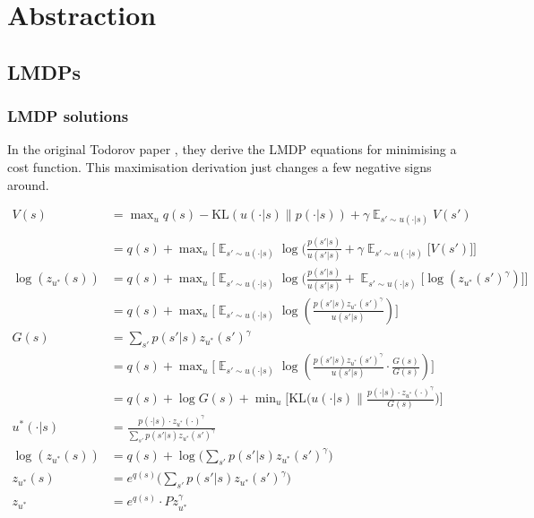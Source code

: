 \chapter{Abstraction}

\section{LMDPs}

\subsection{LMDP solutions}\label{lmdp-derivation}


In the original Todorov paper \cite{Todorov2009}, they derive the LMDP equations for minimising a cost function. This maximisation derivation just changes a few negative signs around.

\begin{align*}
V(s) &= \mathop{\text{max}}_{u} q(s) - \text{KL}(u(\cdot| s) \parallel p(\cdot | s)) + \gamma \mathop{\mathbb E}_{s' \sim u(\cdot | s)} V(s') \tag{1}\\
\\
&= q(s) + \mathop{\text{max}}_{u} \bigg[ \mathop{\mathbb E}_{s' \sim u(\cdot | s)} \log(\frac{p(s' | s) }{ u(s' | s)}+\gamma \mathop{\mathbb E}_{s' \sim u(\cdot | s)} \big[V(s')\big] \bigg] \tag{2}\\
\log(z_{u^{* }}(s)) &= q(s) + \mathop{\text{max}}_{u} \bigg[ \mathop{\mathbb E}_{s' \sim u(\cdot | s)} \log(\frac{p(s' | s) }{ u(s' | s)}+\mathop{\mathbb E}_{s' \sim u(\cdot | s)} \big[\log(z_{u^{* }}(s')^{\gamma})\big] \bigg] \tag{3}\\
&= q(s) + \mathop{\text{max}}_{u} \bigg[ \mathop{\mathbb E}_{s' \sim u(\cdot | s)} \log(\frac{p(s' | s)z_{u^{* }}(s')^{\gamma} }{ u(s' | s)} ) \bigg] \tag{4}\\
G(s) &= \sum_{s'} p(s' | s) z_{u^{* }}(s')^{\gamma} \tag{5}\\
&= q(s) + \mathop{\text{max}}_{u} \bigg[ \mathop{\mathbb E}_{s' \sim u(\cdot | s)} \log(\frac{p(s' | s)z_{u^{* }}(s')^{\gamma} }{ u(s' | s)} \cdot \frac{G(s)}{G(s)} ) \bigg] \tag{6}\\
&= q(s) + \log G(s) + \mathop{\text{min}}_{u} \bigg[\text{KL}\big(u(\cdot | s) \parallel \frac{p(\cdot | s)\cdot z_{u^{* }}(\cdot)^{\gamma}}{G(s)} \big) \bigg] \tag{7}\\
u^{* }(\cdot | s) &= \frac{p(\cdot | s)\cdot z_{u^{* }}(\cdot)^{\gamma}}{\sum_{s'} p(s' | s) z_{u^{* }}(s')^{\gamma}} \tag{8}\\
\log(z_{u^{* }}(s)) &= q(s) + \log \big(\sum_{s'} p(s' | s) z_{u^{* }}(s')^{\gamma}\big) \tag{9}\\
z_{u^{* }}(s) &= e^{q(s)}\big(\sum_{s'} p(s' | s) z_{u^{* }}(s')^{\gamma}\big) \tag{10}\\
z_{u^{* }} &= e^{q(s)}\cdot P z_{u^{* }}^{\gamma} \tag{11}\\
\end{align*}

